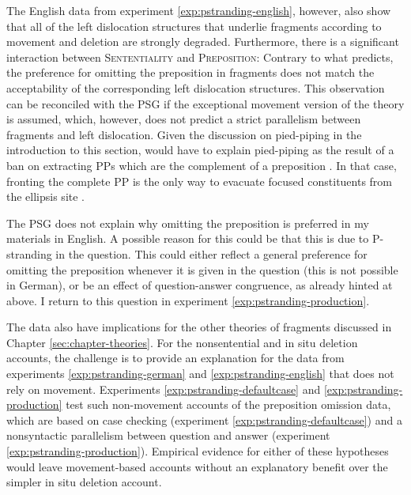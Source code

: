 The English data from experiment \ref{exp:pstranding-english}, however, also show that all of the left dislocation structures that underlie fragments according to movement and deletion are strongly degraded. Furthermore, there is a significant interaction between \textsc{Sententiality} and \textsc{Preposition}: Contrary to what \citet{merchant2004} predicts, the preference for omitting the preposition in fragments does not match the acceptability of the corresponding left dislocation structures. This observation can be reconciled with the PSG if the exceptional movement version of the theory \citep{weir2014} is assumed, which, however, does not predict a strict parallelism between fragments and left dislocation. Given the discussion on pied-piping in the introduction to this section, \citet{weir2014} would have to explain pied-piping as the result of a ban on extracting PPs which are the complement of a preposition \citep{abels2003, abels2012}. In that case, fronting the complete PP is the only way to evacuate focused constituents from the ellipsis site \citep{heck2008}.

The PSG does not explain why omitting the preposition is preferred in my materials in English. A possible reason for this could be that this is due to P-stranding in the question. This could either reflect a general preference for omitting the preposition whenever it is given in the question (this is not possible in German), or be an effect of question-answer congruence, as already hinted at above. I return to this question in experiment \ref{exp:pstranding-production}.

The data also have implications for the other theories of fragments discussed in Chapter \ref{sec:chapter-theories}. For the nonsentential and in situ deletion accounts, the challenge is to provide an explanation for the data from experiments \ref{exp:pstranding-german} and \ref{exp:pstranding-english} that does not rely on movement. Experiments \ref{exp:pstranding-defaultcase} and \ref{exp:pstranding-production} test such non-movement accounts of the preposition omission data, which are based on case checking (experiment \ref{exp:pstranding-defaultcase}) and a nonsyntactic parallelism between question and answer (experiment \ref{exp:pstranding-production}). Empirical evidence for either of these hypotheses would leave movement-based accounts without an explanatory benefit over the simpler in situ deletion account.

